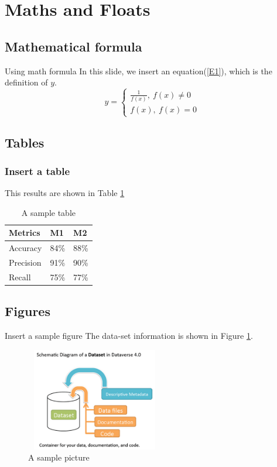 \documentclass[aspectratio=169, 12pt]{beamer}    %
\begin{document}
\section{Maths and Floats}
\subsection{Mathematical formula}
\begin{frame}{Using math formula}
In this slide, we insert an equation(\ref{E1}), which is the definition of $y$.
\begin{equation}
    \label{E1}
    y = 
    \begin{cases}
    \frac{1}{f(x)},\ f(x) \neq 0 \\
    f(x), \ f(x) = 0
    \end{cases}
\end{equation}
\end{frame}


\subsection{Tables}
\begin{frame}
\frametitle{Insert a table}
This results are shown in Table \ref{T1}
\begin{table}[ht]   
    \caption{A sample table}
    \label{T1}
    \centering
    \begin{tabular}{p{1.5cm}|p{1.5cm}|p{1.5cm}}
    \hline
    Metrics     &   M1      &   M2      \\
    \hline
    Accuracy    &   84\%    &   88\%     \\
    Precision   &   91\%    &   90\%     \\
    Recall      &   75\%    &   77\%     \\
    \hline
    \end{tabular}
\end{table}
\end{frame}

\subsection{Figures}
\begin{frame}{Insert a sample figure}
The data-set information is shown in Figure \ref{dataset}.
\begin{figure}
    \centering
    \includegraphics[width=6cm,height=4.5cm]{figs/dataset.png}
    \caption{A sample picture}
    \label{dataset}
\end{figure}
\end{frame}
\end{document}
